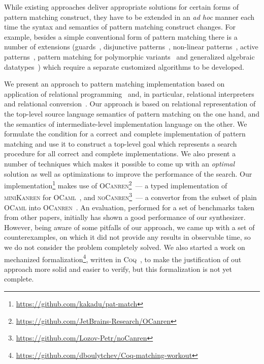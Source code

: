 While existing approaches deliver appropriate solutions for certain forms of pattern matching construct, they have to be extended in an \emph{ad hoc} manner each time
the syntax and semantics of pattern matching construct changes. For example, besides a simple conventional form of pattern matching there is a number of extensions
(guards~\cite{?}, disjunctive patterns~\cite{?}, non-linear patterns~\cite{mcbride1969symbol}, active patterns~\cite{activepatterns}, pattern matching for polymorphic variants~\cite{Garrigue98} and generalized
algebraic datatypes~\cite{?}) which require a separate customized algorithms to be developed.

\begin{comment}
\begin{minipage}[b]{0.5\textwidth}
There are a few different approaches for compiling pattern mathcing. For example, \textsc{GHC}~\cite{?} uses that presented in an influential paper~\cite{Jones1987},
implementation of pattern matching in \textsc{OCaml} is currently based on~\cite{maranget2001} although \cite{maranget2008} reports a slight improvements
of generated code efficiency. 
\end{minipage}
\end{comment}

We present an approach to pattern matching implementation based on application of relational programming~\cite{TRS,WillThesis} and, in particular, relational interpreters~\cite{unified}
and relational conversion~\cite{lozov2017}. Our approach is based on relational representation of the top-level source language semantics of pattern matching on the one hand, and
the semantics of intermediate-level implementation language on the other. We formulate the condition for a correct and complete implementation of pattern matching and use it to
construct a top-level goal which represents a search procedure for all correct and complete implementations. We also present a number of techniques which makes it possible to come up with an
\emph{optimal} solution as well as optimizations to improve the performance of the search. Our implementation\footnote{\url{https://github.com/kakadu/pat-match}} makes use of
\textsc{OCanren}\footnote{\url{https://github.com/JetBrains-Research/OCanren}}~--- a typed implementation of \textsc{miniKanren} for \textsc{OCaml}~\cite{OCanren},
and \textsc{noCanren}\footnote{\url{https://github.com/Lozov-Petr/noCanren}}~--- a convertor from the subset of plain \textsc{OCaml} into \textsc{OCanren}~\cite{lozov2017}.
An evaluation, performed for a set of benchmarks taken from other papers, initially has shown a good performance of our synthesizer. However, being aware of some pitfalls of
our approach, we came up with a set of counterexamples, on which it did not provide any results in observable time, so we do not consider the problem completely solved.
We also started a work on mechanized formalization\footnote{\url{https://github.com/dboulytchev/Coq-matching-workout}}, written in \textsc{Coq}~\cite{Coq}, to
make the justification of out approach more solid and easier to verify, but this formalization is not yet complete. 

 
